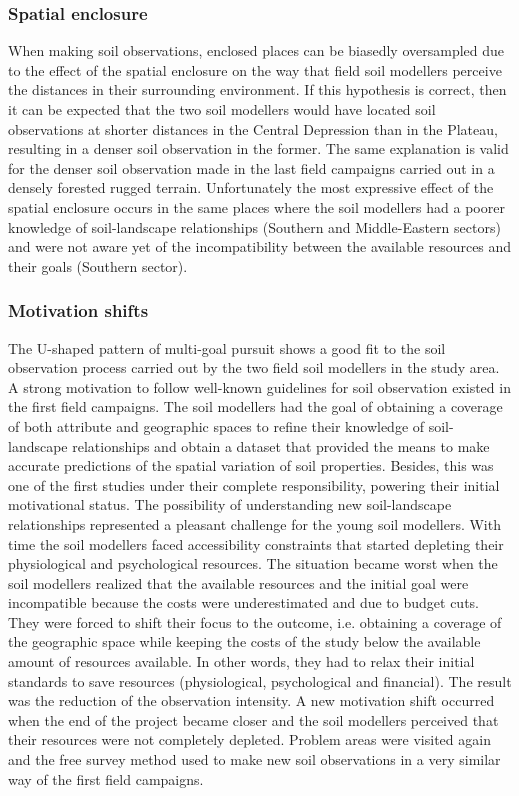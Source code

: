 \subsubsection{Spatial enclosure}

When making soil observations, enclosed places can be biasedly oversampled due to the effect of the spatial 
enclosure on the way that field soil modellers perceive the distances in their surrounding environment. If 
this hypothesis is correct, then it can be expected that the two soil modellers would have located soil 
observations at shorter distances in the Central Depression than in the Plateau, resulting in a denser soil 
observation in the former. The same explanation is valid for the denser soil observation made in the last field
campaigns carried out in a densely forested rugged terrain. Unfortunately the most expressive effect of the 
spatial enclosure occurs in the same places where the soil modellers had a poorer knowledge of soil-landscape 
relationships (Southern and Middle-Eastern sectors) and were not aware yet of the incompatibility between the 
available resources and their goals (Southern sector).

\subsubsection{Motivation shifts}

The U-shaped pattern of multi-goal pursuit shows a good fit to the soil observation process carried out by the 
two field soil modellers in the study area. A strong motivation to follow well-known guidelines for soil 
observation existed in the first field campaigns. The soil modellers had the goal of obtaining a coverage of 
both attribute and geographic spaces to refine their knowledge of soil-landscape relationships and obtain a 
dataset that provided the means to make accurate predictions of the spatial variation of soil properties. 
Besides, this was one of the first studies under their complete responsibility, powering their initial 
motivational status. The possibility of understanding new soil-landscape relationships represented
a pleasant challenge for the young soil modellers. With time the soil modellers faced accessibility 
constraints that started depleting their physiological and psychological resources. The situation became worst 
when the soil modellers realized that the available resources and the initial goal were incompatible because 
the costs were underestimated and due to budget cuts. They were forced to shift their focus to the outcome, 
i.e. obtaining a  coverage of the geographic space while keeping the costs of the study 
below the available amount of resources available. In other words, they had to relax their initial standards 
to save resources (physiological, psychological and financial). The result was the reduction of the 
observation intensity. A new motivation shift occurred when the end of the project became closer and the soil 
modellers perceived that their resources were not completely depleted. Problem areas were visited again and 
the 
free survey method used to make new soil observations in a very similar way of the first field campaigns.

